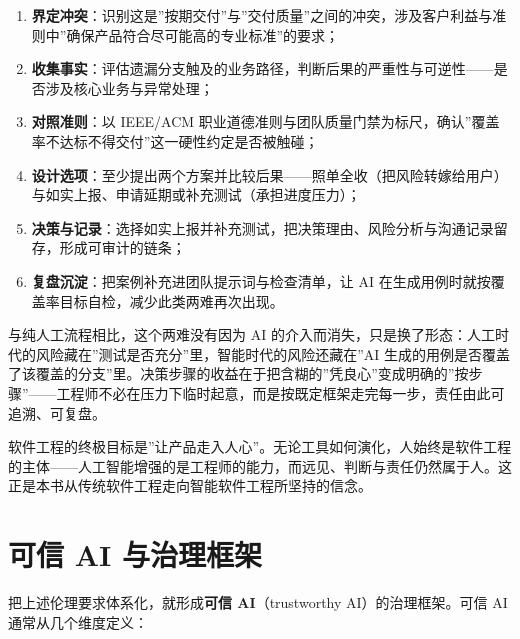 \documentclass[12pt,a4paper,twoside,openany]{ctexbook}
\numberwithin{figure}{chapter}
\numberwithin{table}{chapter}
\providecommand{\tightlist}{\setlength{\itemsep}{0pt}\setlength{\parskip}{0pt}}
\begin{document}
\begin{enumerate}
\def\labelenumi{\arabic{enumi}.}
\tightlist
\item
  \textbf{界定冲突}：识别这是''按期交付''与''交付质量''之间的冲突，涉及客户利益与准则中''确保产品符合尽可能高的专业标准''的要求；
\item
  \textbf{收集事实}：评估遗漏分支触及的业务路径，判断后果的严重性与可逆性------是否涉及核心业务与异常处理；
\item
  \textbf{对照准则}：以 IEEE/ACM
  职业道德准则与团队质量门禁为标尺，确认''覆盖率不达标不得交付''这一硬性约定是否被触碰；
\item
  \textbf{设计选项}：至少提出两个方案并比较后果------照单全收（把风险转嫁给用户）与如实上报、申请延期或补充测试（承担进度压力）；
\item
  \textbf{决策与记录}：选择如实上报并补充测试，把决策理由、风险分析与沟通记录留存，形成可审计的链条；
\item
  \textbf{复盘沉淀}：把案例补充进团队提示词与检查清单，让 AI
  在生成用例时就按覆盖率目标自检，减少此类两难再次出现。
\end{enumerate}

与纯人工流程相比，这个两难没有因为 AI
的介入而消失，只是换了形态：人工时代的风险藏在''测试是否充分''里，智能时代的风险还藏在''AI
生成的用例是否覆盖了该覆盖的分支''里。决策步骤的收益在于把含糊的''凭良心''变成明确的''按步骤''------工程师不必在压力下临时起意，而是按既定框架走完每一步，责任由此可追溯、可复盘。

软件工程的终极目标是''让产品走入人心''。无论工具如何演化，人始终是软件工程的主体------人工智能增强的是工程师的能力，而远见、判断与责任仍然属于人。这正是本书从传统软件工程走向智能软件工程所坚持的信念。

\section{可信 AI
与治理框架}\label{ux53efux4fe1-ai-ux4e0eux6cbbux7406ux6846ux67b6}

把上述伦理要求体系化，就形成\textbf{可信 AI}（trustworthy
AI）的治理框架。可信 AI 通常从几个维度定义：
\end{document}
